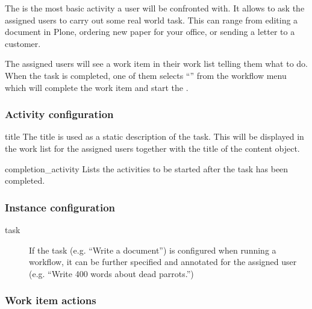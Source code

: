 
  The  is the most basic activity a user will be confronted with.
  It allows to ask the assigned users to carry out some real world task. This
  can range from editing a document in Plone, ordering new paper for your
  office, or sending a letter to a customer.

  The assigned users will see a work item in their work list telling them what
  to do. When the task is completed, one of them selects
  ``'' from the workflow menu which will complete the work
  item and start the .

  \subsubsection{Activity configuration}

            
    \begin{memberdesc}{title} The title is used as a static description of the
            task. This will be displayed in the work list for the assigned
            users together with the title of the content object.
    \end{memberdesc}
          
    \begin{memberdesc}{completion\_activity} Lists the activities to be started
        after the task has been completed.
    \end{memberdesc}

  \subsubsection{Instance configuration}

    \begin{description}
            
        \item[task] If the task (e.g. ``Write a document'') is configured when
            running a workflow, it can be further specified and annotated for
            the assigned user (e.g. ``Write 400 words about dead parrots.'') 

    \end{description}

  \subsubsection{Work item actions}

